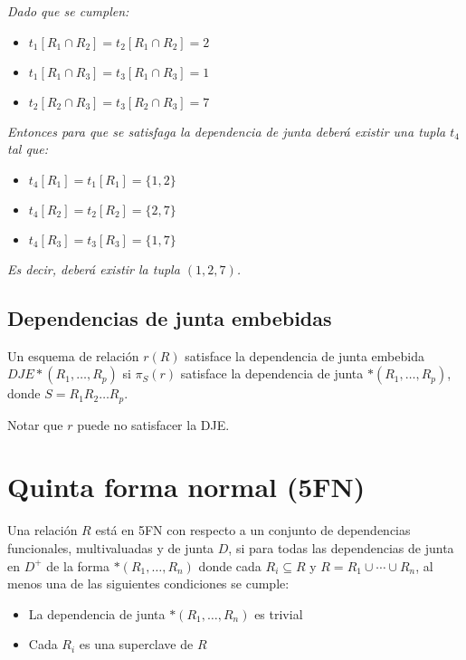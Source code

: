 \documentclass[a4paper, twoside]{article}
\begin{document}
\emph{Dado que se cumplen:}
\begin{itemize}
	\item \emph{$t_{1}\left[R_{1}\cap R_{2}\right]=t_{2}\left[R_{1}\cap R_{2}\right]=2$}
	\item \emph{$t_{1}\left[R_{1}\cap R_{3}\right]=t_{3}\left[R_{1}\cap R_{3}\right]=1$}
	\item \emph{$t_{2}\left[R_{2}\cap R_{3}\right]=t_{3}\left[R_{2}\cap R_{3}\right]=7$}
\end{itemize}

\emph{Entonces para que se satisfaga la dependencia de junta deberá existir una tupla $t_{4}$ tal que:}
\begin{itemize}
	\item \emph{$t_{4}\left[R_{1}\right]=t_{1}\left[R_{1}\right]=\{1,2\}$}
	\item \emph{$t_{4}\left[R_{2}\right]=t_{2}\left[R_{2}\right]=\{2,7\}$}
	\item \emph{$t_{4}\left[R_{3}\right]=t_{3}\left[R_{3}\right]=\{1,7\}$}
\end{itemize}

\emph{Es decir, deberá existir la tupla $\left(1,2,7\right)$.}

\subsection{Dependencias de junta embebidas}
Un esquema de relación $r(R)$ satisface la dependencia de junta embebida $DJE*\left(R_{1},\ldots,R_{p}\right)$ si $\pi_{S}(r)$ satisface la dependencia de junta $*\left(R_{1},\ldots,R_{p}\right)$, donde $S=R_{1}R_{2}\ldots R_{p}$.

Notar que $r$ puede no satisfacer la DJE.

\section{Quinta forma normal (5FN)}
Una relación $R$ está en 5FN con respecto a un conjunto de dependencias funcionales, multivaluadas y de junta $D$, si para todas las dependencias de junta en $D^{+}$ de la forma $*\left(R_{1},\ldots,R_{n}\right)$ donde cada $R_{i}\subseteq R$ y $R=R_{1}\cup\cdots\cup R_{n}$, al menos una de las siguientes condiciones se cumple:
\begin{itemize}
	\item La dependencia de junta $*\left(R_{1},\ldots,R_{n}\right)$ es trivial
	\item Cada $R_{i}$ es una superclave de $R$
\end{itemize}
\end{document}
